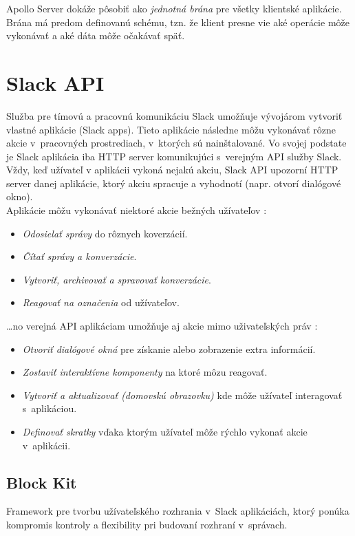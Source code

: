 \noindent Apollo Server dokáže pôsobiť ako \emph{jednotná brána} pre všetky klientské aplikácie. Brána má predom definovanú schému, tzn. že klient presne vie aké operácie môže vykonávať a aké dáta môže očakávať späť.

\section{Slack API}
\label{theory:slack_api}
Služba pre tímovú a pracovnú komunikáciu Slack umožňuje vývojárom vytvoriť vlastné aplikácie (Slack apps). Tieto aplikácie následne môžu vykonávať rôzne akcie v~pracovných prostrediach, v~ktorých sú nainštalované. Vo svojej podstate je Slack aplikácia iba HTTP server komunikujúci s~verejným API služby Slack. Vždy, keď užívateľ v aplikácii vykoná nejakú akciu, Slack API upozorní HTTP server danej aplikácie, ktorý akciu spracuje a vyhodnotí (napr. otvorí dialógové okno). \\

\noindent Aplikácie môžu vykonávať niektoré akcie bežných užívateľov \cite{SlackAPI}:

\begin{itemize}
	\item \emph{Odosielať správy} do rôznych koverzácií.
	\item \emph{Čítať správy a konverzácie}.
	\item \emph{Vytvoriť, archivovať a spravovať konverzácie}.
	\item \emph{Reagovať na označenia} od užívateľov.
\end{itemize}

\ldots no verejná API aplikáciam umožňuje aj akcie mimo uživateľských práv \cite{SlackAPI}:

\begin{itemize}
	\item \emph{Otvoriť dialógové okná} pre získanie alebo zobrazenie extra informácií.
	\item \emph{Zostaviť interaktívne komponenty} na ktoré môzu reagovať.
	\item \emph{Vytvoriť a aktualizovať  (domovskú obrazovku)} kde môže užívateľ interagovať s~aplikáciou.
	\item \emph{Definovať skratky} vďaka ktorým užívateľ môže rýchlo vykonať akcie v~aplikácii.
\end{itemize}

\subsection{Block Kit}
Framework pre tvorbu užívateľského rozhrania v~Slack aplikáciách, ktorý ponúka kompromis kontroly a flexibility pri budovaní rozhraní v~správach. \cite{SlackAPI}

